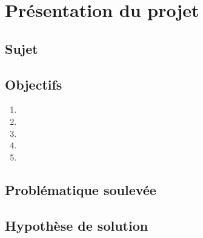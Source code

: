 \chapter{Présentation du projet}
 
\section{Sujet}
 
\begin{mydef}
 
\end{mydef}
 

\section{Objectifs}
\begin{enumerate}
	\item 
	\item  
	\item     
	\item  
	\item 
\end{enumerate}

\section{Problématique soulevée}

\begin{center} 
 
\end{center}

\section{Hypothèse de solution}

 

